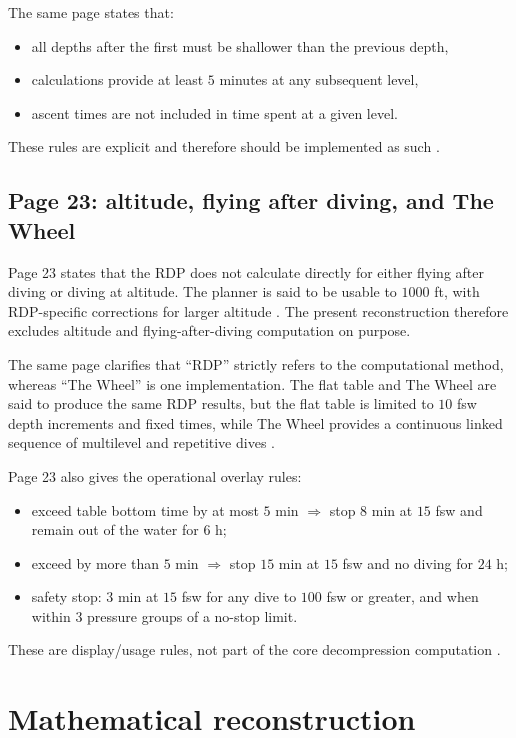 \documentclass[11pt]{article}
\begin{document}
The same page states that:
\begin{itemize}
\item all depths after the first must be shallower than the previous depth,
\item calculations provide at least $5$ minutes at any subsequent level,
\item ascent times are not included in time spent at a given level.
\end{itemize}
These rules are explicit and therefore should be implemented as such \cite[p.~22]{Hamilton1994}.

\subsection{Page 23: altitude, flying after diving, and The Wheel}

Page 23 states that the RDP does not calculate directly for either flying after diving or diving at altitude. The planner is said to be usable to $1000$ ft, with RDP-specific corrections for larger altitude \cite[p.~23]{Hamilton1994}. The present reconstruction therefore excludes altitude and flying-after-diving computation on purpose.

The same page clarifies that ``RDP'' strictly refers to the computational method, whereas ``The Wheel'' is one implementation. The flat table and The Wheel are said to produce the same RDP results, but the flat table is limited to $10$ fsw depth increments and fixed times, while The Wheel provides a continuous linked sequence of multilevel and repetitive dives \cite[p.~23]{Hamilton1994}.

Page 23 also gives the operational overlay rules:
\begin{itemize}
\item exceed table bottom time by at most $5$ min $\Rightarrow$ stop $8$ min at $15$ fsw and remain out of the water for $6$ h;
\item exceed by more than $5$ min $\Rightarrow$ stop $15$ min at $15$ fsw and no diving for $24$ h;
\item safety stop: $3$ min at $15$ fsw for any dive to $100$ fsw or greater, and when within $3$ pressure groups of a no-stop limit.
\end{itemize}
These are display/usage rules, not part of the core decompression computation \cite[p.~23]{Hamilton1994}.

\section{Mathematical reconstruction}
\end{document}
